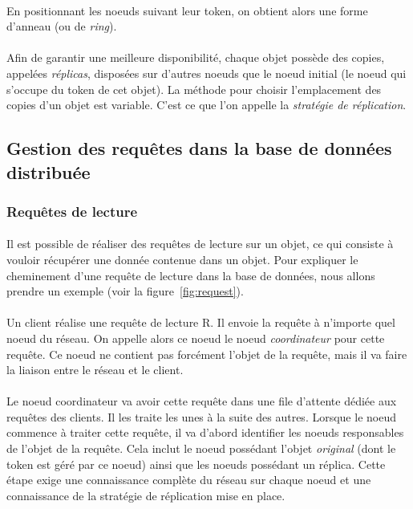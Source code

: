 \documentclass[12pt]{article}
\begin{document}
\paragraph{} En positionnant les noeuds suivant leur token, on obtient alors une forme d'anneau (ou de \textit{ring}).

\paragraph{} Afin de garantir une meilleure disponibilité, chaque objet possède des copies, appelées \textit{réplicas}, disposées sur d'autres noeuds que le noeud initial (le noeud qui s'occupe du token de cet objet). La méthode pour choisir l'emplacement des copies d'un objet est variable. C'est ce que l'on appelle la \textit{stratégie de réplication}.

\subsection{Gestion des requêtes dans la base de données distribuée}
\subsubsection{Requêtes de lecture}

\paragraph{} Il est possible de réaliser des requêtes de lecture sur un objet, ce qui consiste à vouloir récupérer une donnée contenue dans un objet. Pour expliquer le cheminement d'une requête de lecture dans la base de données, nous allons prendre un exemple (voir la figure~\ref{fig:request}).

\paragraph{} Un client réalise une requête de lecture R. Il envoie la requête à n'importe quel noeud du réseau. On appelle alors ce noeud le noeud \textit{coordinateur} pour cette requête. Ce noeud ne contient pas forcément l'objet de la requête, mais il va faire la liaison entre le réseau et le client.

\paragraph{} Le noeud coordinateur va avoir cette requête dans une file d'attente dédiée aux requêtes des clients. Il les traite les unes à la suite des autres. Lorsque le noeud commence à traiter cette requête, il va d'abord identifier les noeuds responsables de l'objet de la requête. Cela inclut le noeud possédant l'objet \textit{original} (dont le token est géré par ce noeud) ainsi que les noeuds possédant un réplica. Cette étape exige une connaissance complète du réseau sur chaque noeud et une connaissance de la stratégie de réplication mise en place.
\end{document}
